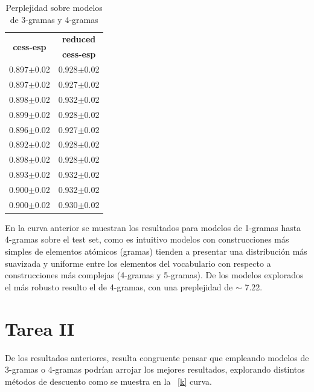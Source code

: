 \documentclass[11pt,a4paper]{report}
\begin{document}
		\begin{table}[thb!]
		\begin{center} 		
			\begin{tabular}{cc} 
				\hline	
				\multirow{2}{*}{\textbf{cess-esp}}&\textbf{reduced}\\
				&\textbf{cess-esp}\\
				\hline
				0.897$\pm$0.02&0.928$\pm$0.02\\
				0.897$\pm$0.02&0.927$\pm$0.02\\
				0.898$\pm$0.02&0.932$\pm$0.02\\
				0.899$\pm$0.02&0.928$\pm$0.02\\
				0.896$\pm$0.02&0.927$\pm$0.02\\
				0.892$\pm$0.02&0.928$\pm$0.02\\
				0.898$\pm$0.02&0.928$\pm$0.02\\
				0.893$\pm$0.02&0.932$\pm$0.02\\
				0.900$\pm$0.02&0.932$\pm$0.02\\
				0.900$\pm$0.02&0.930$\pm$0.02\\
				\hline
			\end{tabular}
			\caption{Perplejidad sobre modelos de 3-gramas y 4-gramas}	
			\label{kk}
		\end{center}
	\end{table}		 	
	

	
	En la curva anterior se muestran los resultados para modelos de 1-gramas hasta 4-gramas sobre el test set, como es intuitivo modelos con construcciones más simples de elementos atómicos (gramas) tienden a presentar una distribución más suavizada y uniforme entre los elementos del vocabulario con respecto a construcciones más complejas (4-gramas y 5-gramas). De los modelos explorados el más robusto  resulto el de 4-gramas, con una preplejidad de $\sim$ 7.22.
	
		\section*{Tarea II}
		
		\noindent De los resultados anteriores, resulta congruente pensar que empleando modelos de 3-gramas o 4-gramas podrían arrojar los mejores resultados, explorando distintos métodos de descuento como se muestra en la \figurename~\ref{k} curva. 
	
\end{document}
